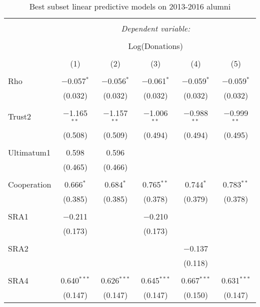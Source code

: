 \newpage

\begin{table}[H] \centering 
  \caption{Best subset linear predictive models on 2013-2016 alumni} 
  \label{} 
    \begin{adjustbox}{width=\textwidth}
\begin{tabular}{@{\extracolsep{5pt}}lccccc} 
\\[-1.8ex]\hline 
\hline \\[-1.8ex] 
 & \multicolumn{5}{c}{\textit{Dependent variable:}} \\ 
\cline{2-6} 
\\[-1.8ex] & \multicolumn{5}{c}{Log(Donations)} \\ 
\\[-1.8ex] & (1) & (2) & (3) & (4) & (5)\\ 
\hline \\[-1.8ex] 
 Rho & $-$0.057$^{*}$ & $-$0.056$^{*}$ & $-$0.061$^{*}$ & $-$0.059$^{*}$ & $-$0.059$^{*}$ \\ 
  & (0.032) & (0.032) & (0.032) & (0.032) & (0.032) \\ 
  & & & & & \\ 
 Trust2 & $-$1.165$^{**}$ & $-$1.157$^{**}$ & $-$1.006$^{**}$ & $-$0.988$^{**}$ & $-$0.999$^{**}$ \\ 
  & (0.508) & (0.509) & (0.494) & (0.494) & (0.495) \\ 
  & & & & & \\ 
 Ultimatum1 & 0.598 & 0.596 &  &  &  \\ 
  & (0.465) & (0.466) &  &  &  \\ 
  & & & & & \\ 
 Cooperation & 0.666$^{*}$ & 0.684$^{*}$ & 0.765$^{**}$ & 0.744$^{*}$ & 0.783$^{**}$ \\ 
  & (0.385) & (0.385) & (0.378) & (0.379) & (0.378) \\ 
  & & & & & \\ 
 SRA1 & $-$0.211 &  & $-$0.210 &  &  \\ 
  & (0.173) &  & (0.173) &  &  \\ 
  & & & & & \\ 
 SRA2 &  &  &  & $-$0.137 &  \\ 
  &  &  &  & (0.118) &  \\ 
  & & & & & \\ 
 SRA4 & 0.640$^{***}$ & 0.626$^{***}$ & 0.645$^{***}$ & 0.667$^{***}$ & 0.631$^{***}$ \\ 
  & (0.147) & (0.147) & (0.147) & (0.150) & (0.147) \\ 

\end{tabular}
\end{adjustbox}
\end{table}

